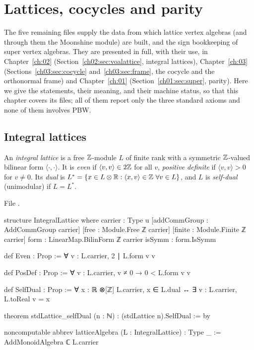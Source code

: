 \section{Lattices, cocycles and parity}\label{l02:sec:lattices}

The five remaining files supply the data from which lattice vertex algebras (and through them the
Moonshine module) are built, and the sign bookkeeping of super vertex algebras. They are presented in
full, with their use, in Chapter~\ref{ch:02} (Section~\ref{ch02:sec:voalattice}, integral lattices),
Chapter~\ref{ch:03} (Sections~\ref{ch03:sec:cocycle} and~\ref{ch03:sec:frame}, the cocycle and the
orthonormal frame) and Chapter~\ref{ch:01} (Section~\ref{ch01:sec:super}, parity). Here we give the
statements, their meaning, and their machine status, so that this chapter covers its files; all of them
report only the three standard axioms and none of them involves PBW.

\subsection{Integral lattices}

\begin{definition}\label{l02:def:lattice}
An \emph{integral lattice} is a free ${\mathbb{Z}}$-module $L$ of finite rank with a symmetric ${\mathbb{Z}}$-valued
bilinear form $\langle\cdot,\cdot\rangle$. It is \emph{even} if $\langle v,v\rangle\in2{\mathbb{Z}}$ for all $v$,
\emph{positive definite} if $\langle v,v\rangle>0$ for $v\ne0$. Its \emph{dual} is
$L^* = \{x\in L\otimes\mathbb{R} : \langle x,v\rangle\in{\mathbb{Z}}\ \forall v\in L\}$, and $L$ is
\emph{self-dual} (unimodular) if $L = L^*$.
\end{definition}

File .
\begin{leancode}
structure IntegralLattice where
  carrier : Type u
  [addCommGroup : AddCommGroup carrier]
  [free : Module.Free ℤ carrier]
  [finite : Module.Finite ℤ carrier]
  form : LinearMap.BilinForm ℤ carrier
  isSymm : form.IsSymm

def Even : Prop := ∀ v : L.carrier, 2 ∣ L.form v v

def PosDef : Prop := ∀ v : L.carrier, v ≠ 0 → 0 < L.form v v

def SelfDual : Prop := ∀ x : ℝ ⊗[ℤ] L.carrier, x ∈ L.dual ↔ ∃ v : L.carrier, L.toReal v = x

theorem stdLattice_selfDual (n : ℕ) : (stdLattice n).SelfDual := by

noncomputable abbrev latticeAlgebra (L : IntegralLattice) : Type _ :=
  AddMonoidAlgebra ℂ L.carrier
\end{leancode}

